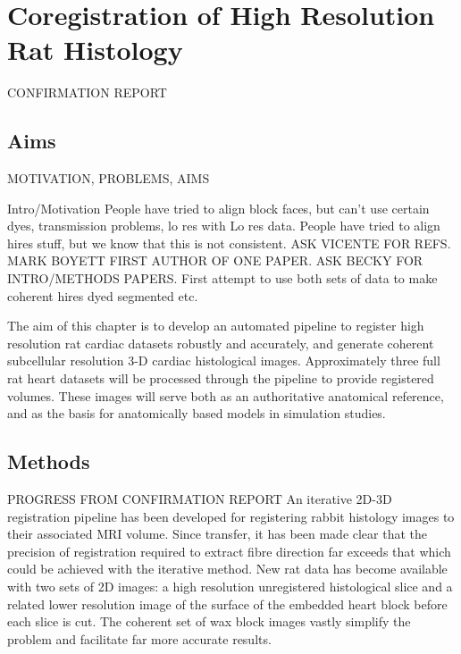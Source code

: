 \chapter{Coregistration of High Resolution Rat Histology}
\dblspace
\begin{quote}{\em }\end{quote}

CONFIRMATION REPORT
\section{Aims}
  MOTIVATION, PROBLEMS, AIMS
  
  Intro/Motivation
  People have tried to align block faces, but can't use certain dyes, transmission problems, lo res with Lo res data.
  People have tried to align hires stuff, but we know that this is not consistent.
  ASK VICENTE FOR REFS. MARK BOYETT FIRST AUTHOR OF ONE PAPER. ASK BECKY FOR INTRO/METHODS PAPERS.
  First attempt to use both sets of data to make coherent hires dyed segmented etc.

  
  
  The aim of this chapter is to develop an automated pipeline to register high resolution rat cardiac datasets robustly and accurately, and generate coherent subcellular resolution 3-D cardiac histological images.  Approximately three full rat heart datasets will be processed through the pipeline to provide registered volumes. These images will serve both as an authoritative anatomical reference, and as the basis for anatomically based models in simulation studies.

\section{Methods} %

PROGRESS FROM CONFIRMATION REPORT 
An iterative 2D-3D registration pipeline has been developed for registering rabbit histology images to their associated MRI volume. Since transfer, it has been made clear that the precision of registration required to extract fibre direction far exceeds that which could be achieved with the iterative method. New rat data has become available with two sets of 2D images: a high resolution unregistered histological slice and a related lower resolution image of the surface of the embedded heart block before each slice is cut. The coherent set of wax block images vastly simplify the problem and facilitate far more accurate results.

